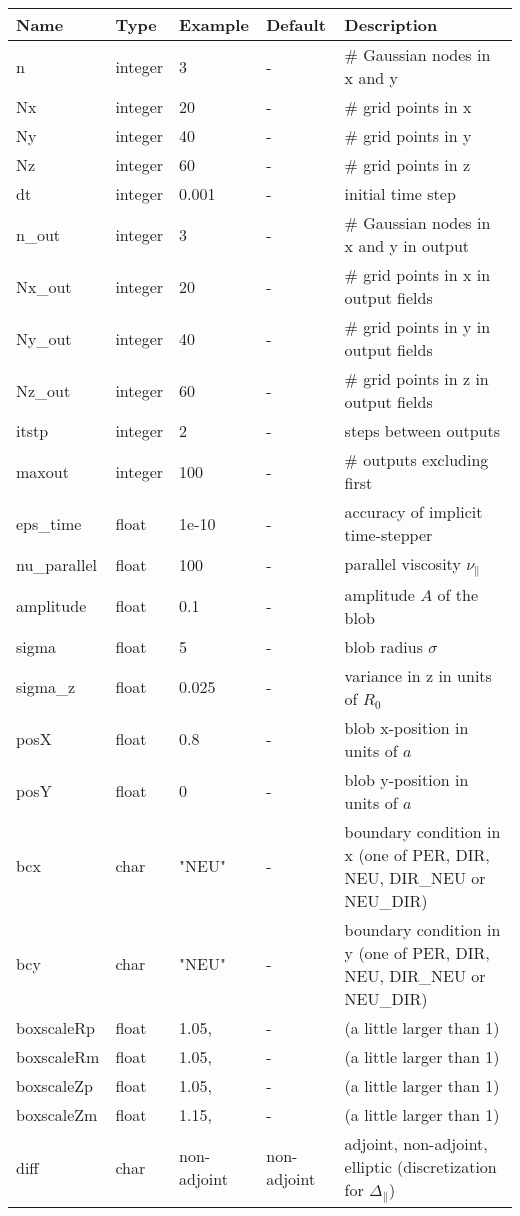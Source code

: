 \begin{longtable}{llll>{\RaggedRight}p{7cm}}
\toprule
\rowcolor{gray!50}\textbf{Name} &  \textbf{Type} & \textbf{Example} & \textbf{Default} & \textbf{Description}  \\ \midrule
  n      & integer & 3 & - &\# Gaussian nodes in x and y \\
  Nx     & integer &20& - &\# grid points in x \\
  Ny     & integer &40& - &\# grid points in y \\
  Nz     & integer &60& - &\# grid points in z \\
  dt     & integer &0.001& - &initial time step\\
  n\_out  & integer &3  & - &\# Gaussian nodes in x and y in output \\
  Nx\_out & integer &20& - &\# grid points in x in output fields \\
  Ny\_out & integer &40& - &\# grid points in y in output fields \\
  Nz\_out & integer &60& - &\# grid points in z in output fields \\
  itstp  & integer &2  & - &   steps between outputs \\
  maxout & integer &100& - &      \# outputs excluding first \\
  eps\_time  & float &1e-10   & - & accuracy of implicit time-stepper \\
  nu\_parallel    & float &100   & - & parallel viscosity $\nu_\parallel$ \\
  amplitude  & float &0.1    & - & amplitude $A$ of the blob \\
  sigma      & float &5     & - & blob radius $\sigma$ \\
  sigma\_z   & float &0.025  & - & variance in z in units of $R_0$ \\
  posX       & float &0.8    & - & blob x-position in units of $a$\\
  posY       & float &0    & - & blob y-position in units of $a$\\
  bcx   & char & "NEU"      & - & boundary condition in x (one of PER, DIR, NEU, DIR\_NEU or NEU\_DIR) \\
  bcy   & char & "NEU"      & - & boundary condition in y (one of PER, DIR, NEU, DIR\_NEU or NEU\_DIR) \\
  boxscaleRp & float &  1.05, & - & (a little larger than 1) \\
  boxscaleRm & float &  1.05, & - & (a little larger than 1) \\
  boxscaleZp & float &  1.05, & - & (a little larger than 1) \\
  boxscaleZm & float &  1.15, & - & (a little larger than 1) \\
  diff       & char & non-adjoint & non-adjoint & adjoint, non-adjoint, elliptic (discretization for $\Delta_\parallel$) \\
\bottomrule
\end{longtable}


